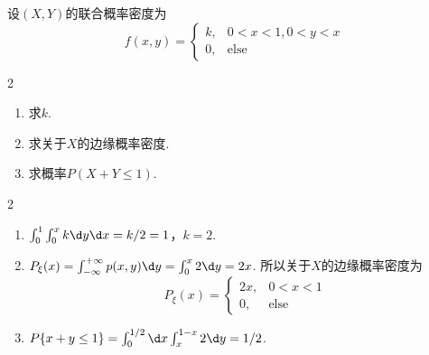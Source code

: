 \begin{problem}
    设$(X,Y)$的联合概率密度为
    \[f(x,y)=\begin{cases}
        k, & 0<x<1,0<y<x\\
        0, & \text{else}
    \end{cases}\]
    \begin{multicols}{2}
        \begin{enumerate}
            \item 求$k$.
            \item 求关于$X$的边缘概率密度.
            \item 求概率$P(X+Y\leq1)$.
        \end{enumerate}
    \end{multicols}
\end{problem}
\begin{paracol}{2}
\begin{solution}\leavevmode
    \begin{enumerate}
        \item $\int_0^1\int_0^xk\d y\d x=k/2=1$，$k=2$.
        \item $P_\xi(x)=\int_{-\infty}^{+\infty}p(x,y)\d y=\int_0^x2\d y=2x$. 所以关于$X$的边缘概率密度为
        \[P_\xi(x)=\begin{cases}
            2x, & 0<x<1\\
            0,  & \text{else}
        \end{cases}\]
        \item $P\{x+y\leq1\}=\int_0^{1/2}\d x\int_x^{1-x}2\d y=1/2$.
    \end{enumerate}
\switchcolumn\centering\vspace*{\fill}
\vspace*{\fill}
\end{solution}
\end{paracol}